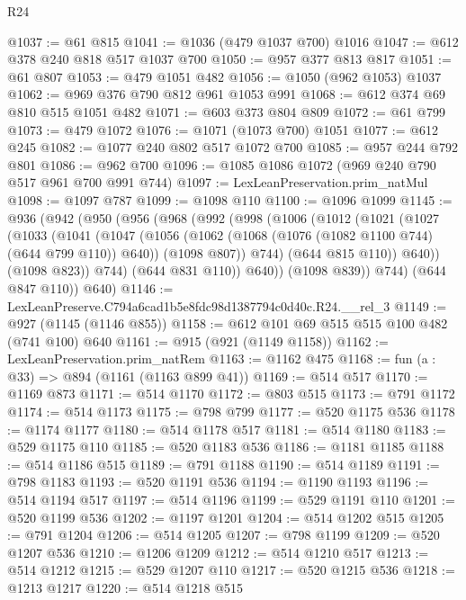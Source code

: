 \begin{lexlean}{R24}
\begin{coremodule}
@1037 := @61 @815
@1041 := @1036 (@479 @1037 @700) @1016
@1047 := @612 @378 @240 @818 @517 @1037 @700
@1050 := @957 @377 @813 @817
@1051 := @61 @807
@1053 := @479 @1051 @482
@1056 := @1050 (@962 @1053) @1037
@1062 := @969 @376 @790 @812 @961 @1053 @991
@1068 := @612 @374 @69 @810 @515 @1051 @482
@1071 := @603 @373 @804 @809
@1072 := @61 @799
@1073 := @479 @1072
@1076 := @1071 (@1073 @700) @1051
@1077 := @612 @245
@1082 := @1077 @240 @802 @517 @1072 @700
@1085 := @957 @244 @792 @801
@1086 := @962 @700
@1096 := @1085 @1086 @1072 (@969 @240 @790 @517 @961 @700 @991 @744)
@1097 := LexLeanPreservation.prim_natMul
@1098 := @1097 @787
@1099 := @1098 @110
@1100 := @1096 @1099
@1145 := @936
    (@942
      (@950
        (@956
          (@968
            (@992
              (@998
                (@1006
                  (@1012
                    (@1021
                      (@1027
                        (@1033
                          (@1041
                            (@1047
                              (@1056
                                (@1062 (@1068 (@1076 (@1082 @1100 @744) (@644 @799 @110)) @640))
                                (@1098 @807))
                              @744)
                            (@644 @815 @110))
                          @640))
                      (@1098 @823))
                    @744)
                  (@644 @831 @110))
                @640))
            (@1098 @839))
          @744)
        (@644 @847 @110))
      @640)
@1146 := LexLeanPreserve.C794a6cad1b5e8fdc98d1387794c0d40c.R24.__rel_3
@1149 := @927 (@1145 (@1146 @855))
@1158 := @612 @101 @69 @515 @515 @100 @482 (@741 @100) @640
@1161 := @915 (@921 (@1149 @1158))
@1162 := LexLeanPreservation.prim_natRem
@1163 := @1162 @475
@1168 := fun (a : @33) => @894 (@1161 (@1163 @899 @41))
@1169 := @514 @517
@1170 := @1169 @873
@1171 := @514 @1170
@1172 := @803 @515
@1173 := @791 @1172
@1174 := @514 @1173
@1175 := @798 @799
@1177 := @520 @1175 @536
@1178 := @1174 @1177
@1180 := @514 @1178 @517
@1181 := @514 @1180
@1183 := @529 @1175 @110
@1185 := @520 @1183 @536
@1186 := @1181 @1185
@1188 := @514 @1186 @515
@1189 := @791 @1188
@1190 := @514 @1189
@1191 := @798 @1183
@1193 := @520 @1191 @536
@1194 := @1190 @1193
@1196 := @514 @1194 @517
@1197 := @514 @1196
@1199 := @529 @1191 @110
@1201 := @520 @1199 @536
@1202 := @1197 @1201
@1204 := @514 @1202 @515
@1205 := @791 @1204
@1206 := @514 @1205
@1207 := @798 @1199
@1209 := @520 @1207 @536
@1210 := @1206 @1209
@1212 := @514 @1210 @517
@1213 := @514 @1212
@1215 := @529 @1207 @110
@1217 := @520 @1215 @536
@1218 := @1213 @1217
@1220 := @514 @1218 @515

\end{coremodule}
\end{lexlean}
